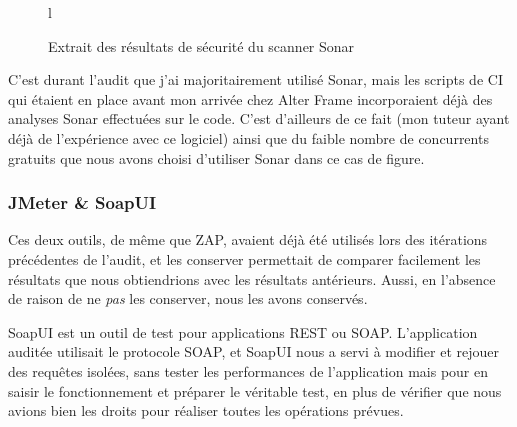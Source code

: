 \begin{figure}{l}
	\caption{Extrait des résultats de sécurité du scanner Sonar}
	\label{fig:sonar_sec}
\end{figure}

C'est durant l'audit que j'ai majoritairement utilisé Sonar, mais les scripts de CI qui étaient en place avant mon arrivée chez Alter Frame incorporaient déjà des analyses Sonar effectuées sur le code. C'est d'ailleurs de ce fait (mon tuteur ayant déjà de l'expérience avec ce logiciel) ainsi que du faible nombre de concurrents gratuits\cite{squale} que nous avons choisi d'utiliser Sonar dans ce cas de figure.

\subsubsection{JMeter \& SoapUI}
Ces deux outils, de même que ZAP, avaient déjà été utilisés lors des itérations précédentes de l'audit, et les conserver permettait de comparer facilement les résultats que nous obtiendrions avec les résultats antérieurs. Aussi, en l'absence de raison de ne \emph{pas} les conserver, nous les avons conservés.

SoapUI\cite{soapui} est un outil de test pour applications REST ou SOAP. L'application auditée utilisait le protocole SOAP, et SoapUI nous a servi à modifier et rejouer des requêtes isolées, sans tester les performances de l'application mais pour en saisir le fonctionnement et préparer le véritable test, en plus de vérifier que nous avions bien les droits pour réaliser toutes les opérations prévues.

